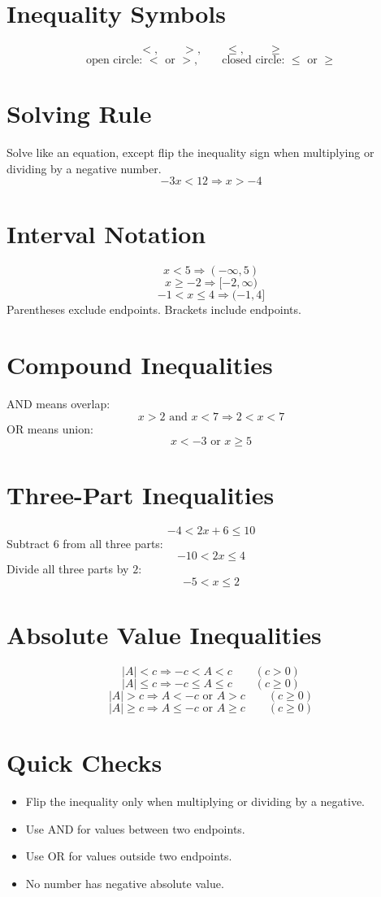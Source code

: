 \documentclass[11pt]{article}
\begin{document}

\section*{Inequality Symbols}
\[
<,\qquad >,\qquad \le,\qquad \ge
\]
\[
\text{open circle: }<\text{ or }>,\qquad
\text{closed circle: }\le\text{ or }\ge
\]

\section*{Solving Rule}
Solve like an equation, except flip the inequality sign when multiplying or dividing by a negative number.
\[
-3x<12 \Rightarrow x>-4
\]

\section*{Interval Notation}
\[
x<5 \Rightarrow (-\infty,5)
\]
\[
x\ge -2 \Rightarrow [-2,\infty)
\]
\[
-1<x\le4 \Rightarrow (-1,4]
\]
Parentheses exclude endpoints. Brackets include endpoints.

\section*{Compound Inequalities}
AND means overlap:
\[
x>2\text{ and }x<7 \Rightarrow 2<x<7
\]
OR means union:
\[
x<-3\text{ or }x\ge5
\]

\section*{Three-Part Inequalities}
\[
-4<2x+6\le10
\]
Subtract $6$ from all three parts:
\[
-10<2x\le4
\]
Divide all three parts by $2$:
\[
-5<x\le2
\]

\section*{Absolute Value Inequalities}
\[
|A|<c \Rightarrow -c<A<c\qquad (c>0)
\]
\[
|A|\le c \Rightarrow -c\le A\le c\qquad (c\ge0)
\]
\[
|A|>c \Rightarrow A<-c\text{ or }A>c\qquad (c\ge0)
\]
\[
|A|\ge c \Rightarrow A\le -c\text{ or }A\ge c\qquad (c\ge0)
\]

\section*{Quick Checks}
\begin{itemize}
  \item Flip the inequality only when multiplying or dividing by a negative.
  \item Use AND for values between two endpoints.
  \item Use OR for values outside two endpoints.
  \item No number has negative absolute value.
\end{itemize}
\end{document}
